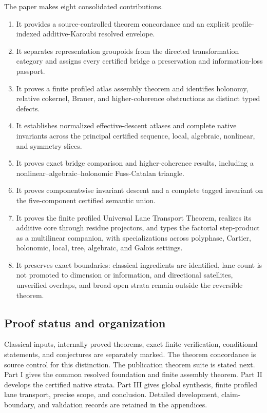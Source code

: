 \documentclass[11pt]{article}
\theoremstyle{definition}
\theoremstyle{remark}
\begin{document}
The paper makes eight consolidated contributions.
\begin{enumerate}
\item It provides a source-controlled theorem concordance and an explicit profile-indexed additive-Karoubi resolved envelope.
\item It separates representation groupoids from the directed transformation category and assigns every certified bridge a preservation and information-loss passport.
\item It proves a finite profiled atlas assembly theorem and identifies holonomy, relative cokernel, Brauer, and higher-coherence obstructions as distinct typed defects.
\item It establishes normalized effective-descent atlases and complete native invariants across the principal certified sequence, local, algebraic, nonlinear, and symmetry slices.
\item It proves exact bridge comparison and higher-coherence results, including a nonlinear--algebraic--holonomic Fuss-Catalan triangle.
\item It proves componentwise invariant descent and a complete tagged invariant on the five-component certified semantic union.
\item It proves the finite profiled Universal Lane Transport Theorem, realizes its additive core through residue projectors, and types the factorial step-product as a multilinear companion, with specializations across polyphase, Cartier, holonomic, local, tree, algebraic, and Galois settings.
\item It preserves exact boundaries: classical ingredients are identified, lane count is not promoted to dimension or information, and directional satellites, unverified overlaps, and broad open strata remain outside the reversible theorem.
\end{enumerate}

\subsection{Proof status and organization}

Classical inputs, internally proved theorems, exact finite verification, conditional statements, and conjectures are separately marked. The theorem concordance is source control for this distinction. The publication theorem suite is stated next. Part I gives the common resolved foundation and finite assembly theorem. Part II develops the certified native strata. Part III gives global synthesis, finite profiled lane transport, precise scope, and conclusion. Detailed development, claim-boundary, and validation records are retained in the appendices.
\end{document}
